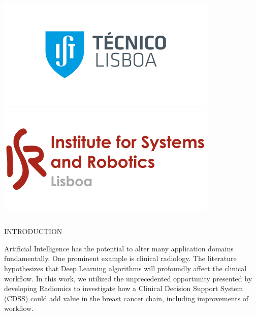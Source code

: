 \documentclass[final]{beamer}
\begin{document}
\begin{frame}[t, fragile = singleslide]{}
\begin{columns}[t]
\begin{column}{0.18\textwidth}
\flushright
\includegraphics[width = 0.8\columnwidth]{./logos/logo003}
\vspace*{\baselineskip}
\includegraphics[width = 0.8\columnwidth]{./logos/logo004}
\end{column}

\begin{column}{0.02\textwidth}
\end{column}

\end{columns}

\begin{columns}[t]

\begin{column}{0.45\textwidth}

\begin{block}{INTRODUCTION}

Artificial Intelligence has the potential to alter many application domains fundamentally.
One prominent example is clinical radiology.
The literature hypothesizes that Deep Learning algorithms will profoundly affect the clinical workflow.
In this work, we utilized the unprecedented opportunity presented by developing Radiomics to investigate how a Clinical Decision Support System (CDSS) could add value in the breast cancer chain, including improvements of workflow.

\end{block}


\end{column}
\end{columns}
\end{frame}
\end{document}
